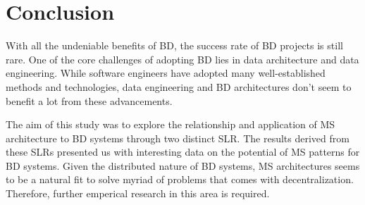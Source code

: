 \documentclass[a4paper,11pt,article,oneside]{memoir}
\begin{document}
\chapter{Conclusion}

With all the undeniable benefits of BD, the success rate of BD projects is still rare. One of the core challenges of adopting BD lies in data architecture and data engineering. While software engineers have adopted many well-established methods and technologies, data engineering and BD architectures don't seem to benefit a lot from these advancements. 

The aim of this study was to explore the relationship and application of MS architecture to BD systems through two distinct SLR. The results derived from these SLRs presented us with interesting data on the potential of MS patterns for BD systems. Given the distributed nature of BD systems, MS architectures seems to be a natural fit to solve myriad of problems that comes with decentralization. Therefore, further emperical research in this area is required.






\printbibliography
\end{document}
